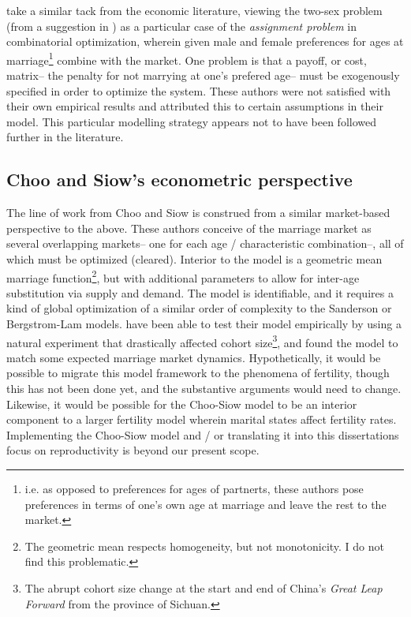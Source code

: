 \citet{bergstrom1994sweden} take a similar tack from the economic literature,
viewing the two-sex problem (from a suggestion in \citet{becker1973theory}) as a
particular case of the \textit{assignment problem} in combinatorial optimization, wherein given male
and female preferences for ages at marriage\footnote{i.e. as opposed to
preferences for ages of partnerts, these authors pose preferences in terms of
one's own age at marriage and leave the rest to the market.} combine with the
market. One problem is that a payoff, or cost, matrix-- the penalty for not
marrying at one's prefered age-- must be exogenously specified in order to
optimize the system. These authors were not satisfied with their own
empirical results and attributed this to certain assumptions in their model.
This particular modelling strategy appears not to have been followed further in
the literature.

\subsection{Choo and Siow's econometric perspective} 
The line of work from Choo
and Siow \citet{choo2006estimating, siow2008does, seitz2010collective} is construed 
from a similar market-based perspective to the above. These
authors conceive of the marriage market as several overlapping markets-- one
for each age / characteristic combination--, all of which must be optimized
(cleared). Interior to the model is a geometric mean marriage
function\footnote{The geometric mean respects homogeneity, but not
monotonicity. I do not find this problematic.}, but with additional
parameters to allow for inter-age substitution via supply and demand. The model
is identifiable, and it requires a kind of global optimization of a similar
order of complexity to the Sanderson or Bergstrom-Lam models. \citet{siow2008does} have
been able to test their model empirically by using a natural experiment that
drastically affected cohort size\footnote{The abrupt cohort size change at the
start and end of China's \textit{Great Leap Forward} from the province of
Sichuan.}, and found the model to match some expected marriage market
dynamics. Hypothetically, it would be possible to migrate this model framework
to the phenomena of fertility, though this has not been done yet, and the
substantive arguments would need to change. Likewise, it would be possible for
the Choo-Siow model to be an interior component to a larger fertility model
wherein marital states affect fertility rates. Implementing the Choo-Siow model
and / or translating it into this dissertations focus on reproductivity is
beyond our present scope. 

